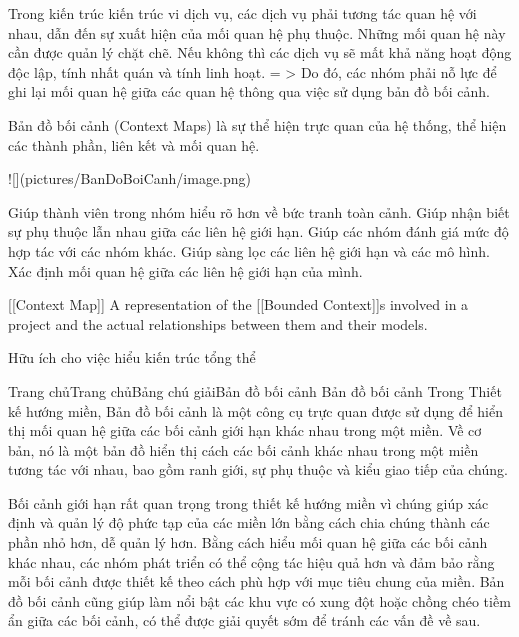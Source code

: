 
Trong kiến trúc kiến trúc vi dịch vụ, các dịch vụ phải tương tác quan hệ với nhau, dẫn đến sự xuất hiện của mối quan hệ phụ thuộc. Những mối quan hệ này cần được quản lý chặt chẽ. Nếu không thì các dịch vụ sẽ mất khả năng hoạt động độc lập, tính nhất quán và tính linh hoạt.
= > Do đó, các nhóm phải nỗ lực để ghi lại mối quan hệ giữa các quan hệ thông qua việc sử dụng bản đồ bối cảnh.

Bản đồ bối cảnh (Context Maps) là sự thể hiện trực quan của hệ thống, thể hiện các thành phần, liên kết và mối quan hệ.

![](pictures/BanDoBoiCanh/image.png)


Giúp thành viên trong nhóm hiểu rõ hơn về bức tranh toàn cảnh.
Giúp nhận biết sự phụ thuộc lẫn nhau giữa các liên hệ giới hạn.
Giúp các nhóm đánh giá mức độ hợp tác với các nhóm khác.
Giúp sàng lọc các liên hệ giới hạn và các mô hình.
Xác định mối quan hệ giữa các liên hệ giới hạn của mình.

[[Context Map]] A representation of the [[Bounded Context]]s involved in a project and the actual relationships between them and their models.

Hữu ích cho việc hiểu kiến trúc tổng thể


Trang chủTrang chủBảng chú giảiBản đồ bối cảnh
Bản đồ bối cảnh
Trong Thiết kế hướng miền, Bản đồ bối cảnh là một công cụ trực quan được sử dụng để hiển thị mối quan hệ giữa các bối cảnh giới hạn khác nhau trong một miền. Về cơ bản, nó là một bản đồ hiển thị cách các bối cảnh khác nhau trong một miền tương tác với nhau, bao gồm ranh giới, sự phụ thuộc và kiểu giao tiếp của chúng.

Bối cảnh giới hạn rất quan trọng trong thiết kế hướng miền vì chúng giúp xác định và quản lý độ phức tạp của các miền lớn bằng cách chia chúng thành các phần nhỏ hơn, dễ quản lý hơn. Bằng cách hiểu mối quan hệ giữa các bối cảnh khác nhau, các nhóm phát triển có thể cộng tác hiệu quả hơn và đảm bảo rằng mỗi bối cảnh được thiết kế theo cách phù hợp với mục tiêu chung của miền. Bản đồ bối cảnh cũng giúp làm nổi bật các khu vực có xung đột hoặc chồng chéo tiềm ẩn giữa các bối cảnh, có thể được giải quyết sớm để tránh các vấn đề về sau.

